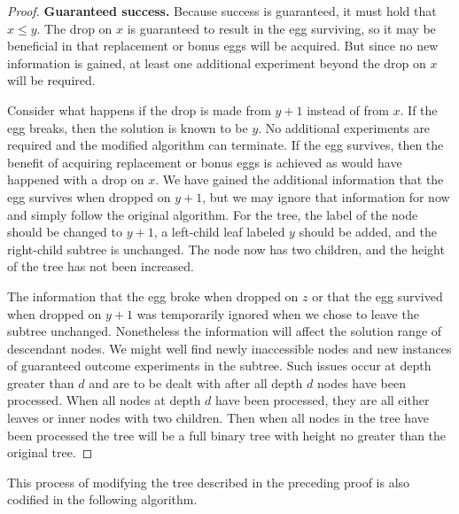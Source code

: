 \documentclass[12pt]{amsart}
\theoremstyle{definition}
\theoremstyle{theorem}
\begin{document}
\begin{proof}
\medskip
\noindent
\textbf{Guaranteed success.}
Because success is guaranteed, it must hold that $x\leq y$.
The drop on $x$ is guaranteed to result in the egg surviving, 
so it may be  beneficial  in that  replacement or bonus eggs will be acquired. But since
no new information is gained, 
at least one additional experiment beyond the drop on $x$ will be required.  

Consider what happens if  the drop is made from $y+1$ instead of from $x$.
If the egg breaks, then the solution is known to be $y$. No additional 
experiments are required and the modified algorithm can terminate.
If the egg survives, then the benefit of acquiring replacement or bonus 
eggs is achieved as would have happened with a drop on $x$. 
We have gained the additional information that the egg survives when 
dropped on $y+1$, but we may ignore that information for now and 
simply follow the original algorithm.
For the tree, the label of the node should be changed to $y+1$,
a left-child leaf labeled $y$ should be added, and the right-child
subtree is unchanged. The node now has two children, and 
the height of the tree has not been increased. 

\medskip
The information that the egg broke when dropped on $z$
or  that the egg  survived when dropped on $y+1$ was 
temporarily ignored when we chose to leave the  subtree unchanged. Nonetheless
the information will affect the solution range
of descendant nodes.
We might well find newly inaccessible nodes and   new instances of guaranteed outcome
experiments in the   subtree.  Such issues occur at depth greater than $d$
and are to be dealt with after all depth $d$ nodes 
have been processed. When all nodes at depth $d$ have been processed, they are
all either leaves or inner nodes with two children. 
Then when all nodes in the tree have
been processed the tree will be a full binary tree with height no greater than the 
original tree.
\end{proof}

This process of modifying the tree described in the preceding proof 
is also codified in the following algorithm.
\end{document}
